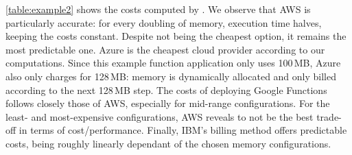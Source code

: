 \autoref{table:example2} shows the costs computed by \sys.
We observe that \gls{AWS} is particularly accurate: for every doubling of memory, execution time halves, keeping the costs constant.
Despite not being the cheapest option, it remains the most predictable one. 
Azure is the cheapest cloud provider according to our computations.
Since this example function application only uses 100\,\gls{MB}, Azure also only charges for 128\,\gls{MB}: memory is dynamically allocated and only billed according to the next 128\,MB step.
The costs of deploying Google Functions follows closely those of \gls{AWS}, especially for mid-range configurations.
For the least- and most-expensive configurations, AWS reveals to not be the best trade-off in terms of cost/performance.
Finally, IBM's billing method offers predictable costs, being roughly linearly dependant of the chosen memory configurations.

